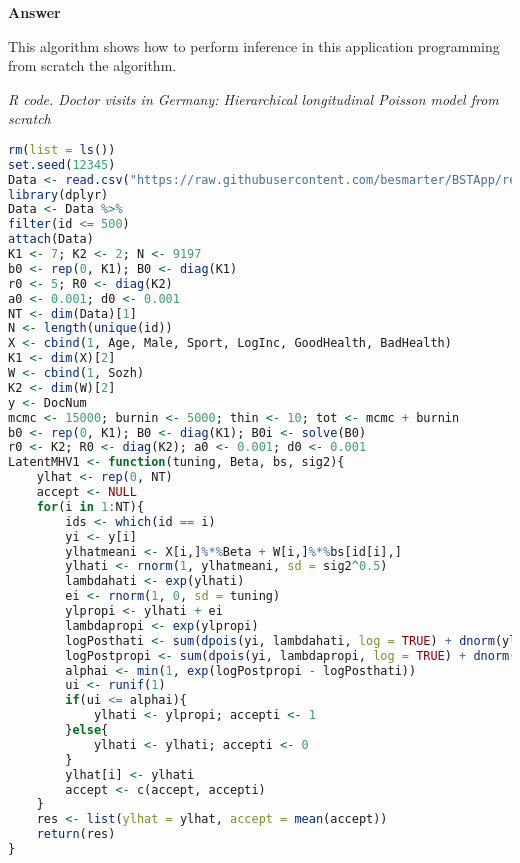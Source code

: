 \begin{enumerate}[leftmargin=*]
\textbf{Answer}

This algorithm shows how to perform inference in this application programming from scratch the algorithm.

\begin{tcolorbox}[enhanced,width=4.67in,center upper,
	fontupper=\large\bfseries,drop shadow southwest,sharp corners]
	\textit{R code. Doctor visits in Germany: Hierarchical longitudinal Poisson model from scratch}
	\begin{VF}
		\begin{lstlisting}[language=R]
rm(list = ls())
set.seed(12345)
Data <- read.csv("https://raw.githubusercontent.com/besmarter/BSTApp/refs/heads/master/DataApp/9VisitDoc.csv", sep = ",", header = TRUE, quote = "")
library(dplyr)
Data <- Data %>% 
filter(id <= 500)
attach(Data)
K1 <- 7; K2 <- 2; N <- 9197
b0 <- rep(0, K1); B0 <- diag(K1)
r0 <- 5; R0 <- diag(K2)
a0 <- 0.001; d0 <- 0.001
NT <- dim(Data)[1]
N <- length(unique(id))
X <- cbind(1, Age, Male, Sport, LogInc, GoodHealth, BadHealth)
K1 <- dim(X)[2]
W <- cbind(1, Sozh)
K2 <- dim(W)[2]
y <- DocNum
mcmc <- 15000; burnin <- 5000; thin <- 10; tot <- mcmc + burnin
b0 <- rep(0, K1); B0 <- diag(K1); B0i <- solve(B0) 
r0 <- K2; R0 <- diag(K2); a0 <- 0.001; d0 <- 0.001
LatentMHV1 <- function(tuning, Beta, bs, sig2){
	ylhat <- rep(0, NT)
	accept <- NULL
	for(i in 1:NT){
		ids <- which(id == i)
		yi <- y[i]
		ylhatmeani <- X[i,]%*%Beta + W[i,]%*%bs[id[i],]
		ylhati <- rnorm(1, ylhatmeani, sd = sig2^0.5)
		lambdahati <- exp(ylhati)
		ei <- rnorm(1, 0, sd = tuning)
		ylpropi <- ylhati + ei
		lambdapropi <- exp(ylpropi)
		logPosthati <- sum(dpois(yi, lambdahati, log = TRUE) + dnorm(ylhati, ylhatmeani, sig2^0.5, log = TRUE))
		logPostpropi <- sum(dpois(yi, lambdapropi, log = TRUE) + dnorm(ylpropi, ylhatmeani, sig2^0.5, log = TRUE))
		alphai <- min(1, exp(logPostpropi - logPosthati))
		ui <- runif(1)
		if(ui <= alphai){
			ylhati <- ylpropi; accepti <- 1
		}else{
			ylhati <- ylhati; accepti <- 0
		}
		ylhat[i] <- ylhati
		accept <- c(accept, accepti)
	}
	res <- list(ylhat = ylhat, accept = mean(accept))
	return(res)
}
\end{lstlisting}
	\end{VF}
\end{tcolorbox} 


\end{enumerate}
